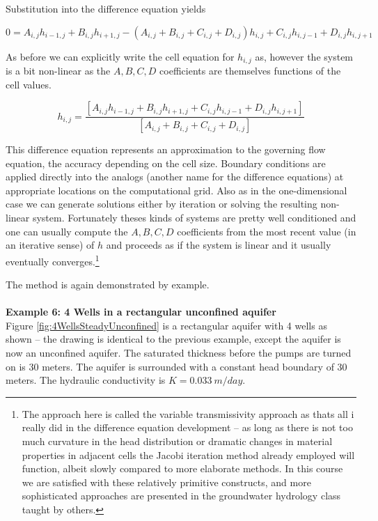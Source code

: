 Substitution into the difference equation yields

\begin{equation}
0 = A_{i,j}h_{i-1,j} + B_{i,j}h_{i+1,j} - (A_{i,j}+B_{i,j}+C_{i,j}+D_{i,j})h_{i,j} + C_{i,j}h_{i,j-1} + D_{i,j}h_{i,j+1}
\end{equation}

As before we can explicitly write the cell equation for $h_{i,j}$ as, however the system is a bit non-linear as the $A,B,C,D$ coefficients are themselves functions of the cell values.

\begin{equation}
h_{i,j} = \frac{[A_{i,j}h_{i-1,j} + B_{i,j}h_{i+1,j} + C_{i,j}h_{i,j-1} + D_{i,j}h_{i,j+1}]}{[A_{i,j}+B_{i,j}+C_{i,j}+D_{i,j}]}
\end{equation}

This difference equation represents an approximation to the governing flow equation, the accuracy depending on the cell
size. Boundary conditions are applied directly into the analogs (another name for the difference equations) at appropriate
locations on the computational grid. Also as in the one-dimensional case we can generate solutions either by iteration or solving the resulting non-linear system.  
Fortunately theses kinds of systems are pretty well conditioned and one can usually compute the $A,B,C,D$ coefficients from the most recent value (in an iterative sense) of $h$ and proceeds as if the system is linear and it usually eventually converges.\footnote{The approach here is called the variable transmissivity approach as thats all i really did in the difference equation development -- as long as there is not too much curvature in the head distribution or dramatic changes in material properties in adjacent cells the Jacobi iteration method already employed will function, albeit slowly compared to more elaborate methods.  In this course we are satisfied with these relatively primitive constructs, and more sophisticated approaches are presented in the groundwater hydrology class taught by others.}

The method is again demonstrated by example.\\~\\
\textbf{Example 6: 4 Wells in a rectangular unconfined aquifer}~\\
Figure \ref{fig:4WellsSteadyUnconfined} is a rectangular aquifer with 4 wells as shown -- the drawing is identical to the previous example, except the aquifer is now an unconfined aquifer.  
The saturated thickness before the pumps are turned on is 30 meters.
The aquifer is surrounded with a constant head boundary of 30 meters.
The hydraulic conductivity is $K=0.033~m/day$.

